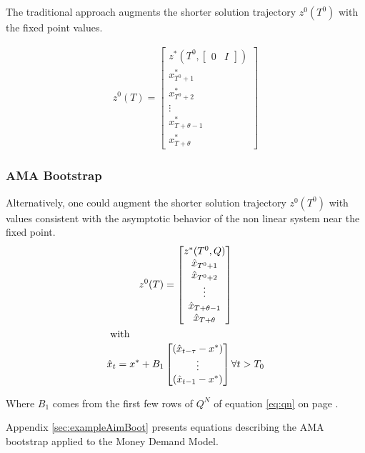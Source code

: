 \documentclass[12pt]{article}
\begin{document}
The traditional approach 
augments the shorter solution trajectory $z^0(T^0)$ with the fixed point values.

\begin{gather*}
  z^0(T)= 
  \begin{bmatrix}
z^\ast(T^0,
\begin{bmatrix}
  0&I
\end{bmatrix}
)\\
    x^\ast_{T^0+1}\\
    x^\ast_{T^0+2}\\
\vdots\\
    x^\ast_{T+\theta-1}\\
    x^\ast_{T+\theta}
  \end{bmatrix}
\end{gather*}





\subsubsection{ AMA Bootstrap}

Alternatively, one could
augment the shorter solution trajectory $z^0(T^0)$ with 
values consistent with the asymptotic behavior of the non linear
system near the fixed point.
\begin{gather*}
  z^0(T)= 
  \begin{bmatrix}
z^\ast(T^0,Q)\\
\hat{x}_{T^0+1}\\
\hat{x}_{T^0+2}\\
\vdots \\
\hat{x}_{T+\theta-1}\\
    \hat{x}_{T+\theta}
  \end{bmatrix}\\
\intertext{ with}
\hat{x}_{t}= x^\ast + 
B_1 
    \begin{bmatrix}
    (\hat{x}_{t-\tau}-x^\ast)\\
\vdots\\
    (\hat{x}_{t-1}-x^\ast)
    \end{bmatrix}  \forall t > T_0
\end{gather*}

Where $B_1$ comes from the first few rows of $Q^N$ of equation \ref{eq:qn} on
page \pageref{eq:qn}.

Appendix \ref{sec:exampleAimBoot} presents equations describing the AMA
bootstrap applied to the Money Demand Model.
\end{document}
